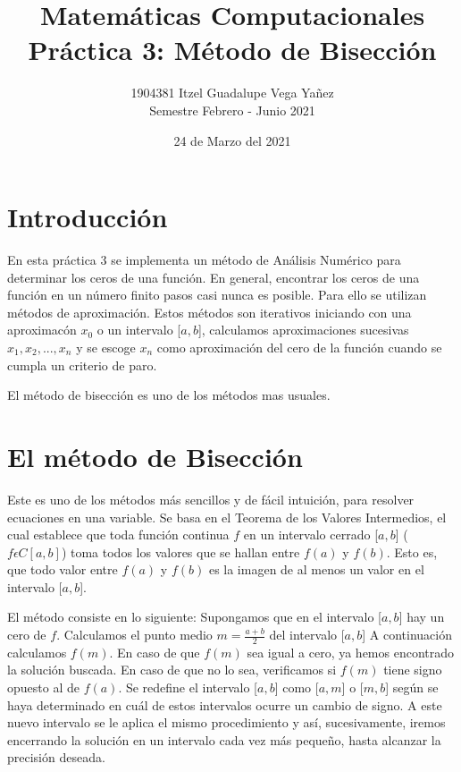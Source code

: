 \documentclass[12pt,a4paper]{article}
\title{Matemáticas Computacionales \\ Práctica 3: Método de Bisección}
\author{1904381 Itzel Guadalupe Vega Yañez \\ Semestre Febrero - Junio 2021}
\date{24 de Marzo del 2021}
\begin{document}
\maketitle

\section{Introducci\'{o}n}\label{sec:intro}

\onehalfspacing
En esta práctica 3 se implementa un método de Análisis Numérico para determinar los ceros de una función. En general, encontrar los ceros de una función en un número finito pasos casi nunca es posible. Para ello se utilizan métodos de aproximación. Estos métodos son iterativos iniciando con una aproximacón $x_{0}$ o un intervalo [$a, b$], calculamos aproximaciones sucesivas $x_{1}, x_{2},..., x_{n}$ y se escoge $x_{n}$ como aproximación del cero de la función cuando se cumpla un criterio de paro.

El método de bisección es uno de los métodos mas usuales.\citep{metodosnumericos}

\section{El m\'{e}todo de Bisecci\'{o}n} \label{sec:metodobiseccion}

\onehalfspacing
Este es uno de los métodos más sencillos y de fácil intuición, para resolver ecuaciones en una variable. Se basa en el Teorema de los Valores Intermedios, el cual establece que toda función continua $f$ en un intervalo cerrado [$a,b$] ($f \epsilon C[a,b]$) toma todos los valores que se hallan entre $f(a)$ y $f(b)$. Esto es, que todo valor entre $f(a)$ y $f(b)$ es la imagen de al menos un valor en el intervalo [$a,b$]. 





El método consiste en lo siguiente: Supongamos que en el intervalo [$a,b$] hay un cero de $f$. Calculamos el punto medio $m=\frac{a+b}{2}$ del intervalo [$a,b$] A continuación calculamos $f(m)$. En caso de que $f(m)$ sea igual a cero, ya hemos encontrado la solución buscada. En caso de que no lo sea, verificamos si $f(m)$ tiene signo opuesto al de $f(a)$. Se redefine el intervalo [$a,b$] como [$a,m$] o [$m,b$] según se haya determinado en cuál de estos intervalos ocurre un cambio de signo. A este nuevo intervalo se le aplica el mismo procedimiento y así, sucesivamente, iremos encerrando la solución en un intervalo cada vez más pequeño, hasta alcanzar la precisión deseada.\citep{repositorio}
\end{document}
